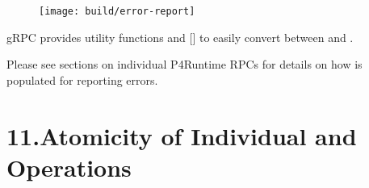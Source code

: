 \documentclass[11pt]{article}
\begin{document}
{%
\begin{figure}[tbp]%
\begin{mdcenter}%

\noindent{}\texttt{[image: build/error-report]}{}%

\mdhr{}%

\noindent{}%
\end{mdcenter}\label{fig-error-report}%
\end{figure}%

\noindent{}gRPC provides utility functions  and 
[] to easily convert between  and
.%

Please see sections on individual P4Runtime RPCs for details on how
 is populated for reporting errors.%

\section{11.\hspace*{0.5em}Atomicity of Individual  and  Operations}\label{sec-atomicity-of-individual-write-and-read-operations}%

}
\end{document}
